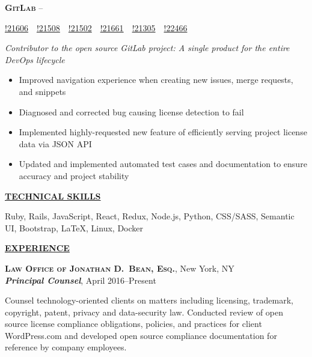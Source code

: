 \documentclass[11pt,letterpaper,english]{article}
\newenvironment{resumelist}[1]
{\begin{list}{}
{\setlength\itemsep{0pt}
\setlength\topsep{0pt}
\setlength\parskip{0pt}
\setlength\parsep{0pt}
\settowidth{\labelwidth}{#1}
 \setlength{\leftmargin}{\labelwidth}
 \addtolength{\leftmargin}{\labelsep}
 \renewcommand{\makelabel}[1]{##1\hfil}}}
{\end{list}}
\begin{document}
\textbf{\textsc{GitLab}} 
--\begin{small}
\href{https://gitlab.com/gitlab-org/gitlab-ce/merge_requests/21606}{!21606}~\color{darkgray}{|}~\href{https://gitlab.com/gitlab-org/gitlab-ce/merge_requests/21508}{!21508}~\color{darkgray}{|}~\href{https://gitlab.com/gitlab-org/gitlab-ce/merge_requests/21502}{!21502}~\color{darkgray}{|}~\href{https://gitlab.com/gitlab-org/gitlab-ce/merge_requests/21661}{!21661}~\color{darkgray}{|}~\href{https://gitlab.com/gitlab-org/gitlab-ce/merge_requests/21305}{!21305}~\color{darkgray}{|}~\href{https://gitlab.com/gitlab-org/gitlab-ce/merge_requests/22466}{!22466}\\
\end{small}
\textit{Contributor to the open source GitLab project: A single product for the entire DevOps lifecycle}
\begin{itemize}
\item Improved navigation experience when creating new issues, merge requests, and snippets
\item Diagnosed and corrected bug causing license detection to fail
\item Implemented highly-requested new feature of efficiently serving project license data via JSON API
\item Updated and implemented automated test cases and documentation to ensure accuracy and project stability
\end{itemize}
\bigskip

\label{Skills}
\underline{\textbf{\textsc{\large TECHNICAL SKILLS}}}{\large \par}
\smallskip
Ruby, Rails, JavaScript, React, Redux, Node.js, Python, CSS/SASS, Semantic UI, Bootstrap, \LaTeX, Linux, Docker
\bigskip


\label{Experience}
\underline{\textbf{\textsc{\large EXPERIENCE}}}{\large \par}
\smallskip

\textbf{\textsc{Law Office of Jonathan D.\ Bean, Esq.}}, New York, NY\\\nopagebreak
\textbf{\textit{Principal Counsel}}, April 2016--Present%
\begin{resumelist}{M}
\item    
Counsel technology-oriented clients on matters including licensing, trademark, copyright, patent, privacy and data-security law. Conducted review of open source license compliance obligations, policies, and practices for client WordPress.com and developed open source compliance documentation for reference by company employees.
\end{resumelist}
\smallskip
\end{document}
